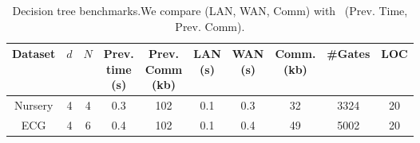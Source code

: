\setlength\tabcolsep{3.8pt}

\begin{table}[t]
\begin{tabular}{|c|c|c|c|c|c|c|c|c|c|}
\hline
Dataset  & $d$ & $N$ & \thead{Prev. \\ time\\ (s)} & \thead{Prev. \\ Comm\\ (kb)} & \thead{LAN  \\ (s)} & \thead{WAN\\ (s)} & \thead{Comm. \\(kb)}& \#Gates & LOC\\
\hline
Nursery & 4 & 4 & 0.3 & 102 & 0.1 & 0.3 & 32 & 3324 & 20\\
\hline
ECG & 4 &  6 & 0.4 & 102 & 0.1 & 0.4 & 49  & 5002 & 20\\
\hline
\end{tabular}
\caption{Decision tree benchmarks.We compare \tool (LAN, WAN, Comm)
 with~\cite{wu} (Prev. Time, Prev. Comm).}
 \label{tab:dt} 
\end{table}



